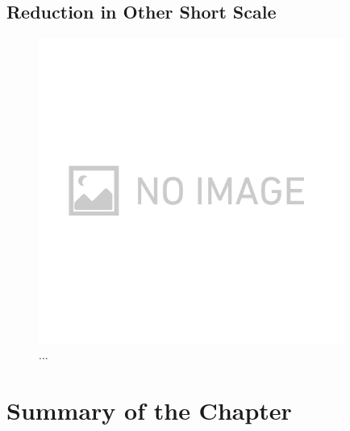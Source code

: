 \subsection{Reduction in Other Short Scale}

\begin{figure}[H]
  \begin{center}   
    \includegraphics[width=10.0cm]{./img_chap3/img320.png}
    \caption{...}\label{img:img320}
  \end{center}
\end{figure}



\section{Summary of the Chapter}
